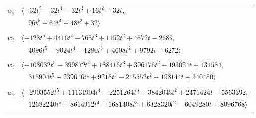 \documentclass[11pt]{article}
\begin{document}
\begin{longtable}{@{}ll@{}}
$w_i$ & $\langle -32t^{5}-32t^{4}-32t^{3}+16t^{2}-32t,$\\
 & $\quad 96t^{5}-64t^{4}+48t^{2}+32\rangle$\\
\addlinespace[2pt]
\multicolumn{2}{@{}p{0.97\textwidth}@{}}{$i=34$, $D_i=2$, $e_i=1$, $\rho_{ij}$: $2{:}1, \allowbreak 3{:}1, \allowbreak 7{:}2, \allowbreak 8{:}3, \allowbreak 16{:}3, \allowbreak 32{:}2, \allowbreak 35{:}1, \allowbreak 36{:}2, \allowbreak 37{:}1, \allowbreak 46{:}3, \allowbreak 60{:}3, \allowbreak 62{:}3, \allowbreak 65{:}1, \allowbreak 66{:}1, \allowbreak 70{:}1$}\\
$w_i$ & $\langle -128t^{5}+4416t^{4}-768t^{3}+1152t^{2}+4672t-2688,$\\
 & $\quad 4096t^{5}+9024t^{4}-1280t^{3}+4608t^{2}+9792t-6272\rangle$\\
\addlinespace[2pt]
\multicolumn{2}{@{}p{0.97\textwidth}@{}}{$i=35$, $D_i=2$, $e_i=0$, $\rho_{ij}$: $2{:}1, \allowbreak 4{:}1, \allowbreak 6{:}2, \allowbreak 16{:}1, \allowbreak 20{:}3, \allowbreak 23{:}1, \allowbreak 24{:}2, \allowbreak 25{:}3, \allowbreak 30{:}2, \allowbreak 32{:}2, \allowbreak 34{:}3, \allowbreak 37{:}2, \allowbreak 50{:}3, \allowbreak 57{:}2, \allowbreak 58{:}3, \allowbreak 69{:}2, \allowbreak 74{:}3$}\\
$w_i$ & $\langle -108032t^{5}-399872t^{4}+188416t^{3}+306176t^{2}-193024t+131584,$\\
 & $\quad 315904t^{5}+239616t^{4}+9216t^{3}-215552t^{2}-198144t+340480\rangle$\\
\addlinespace[2pt]
\multicolumn{2}{@{}p{0.97\textwidth}@{}}{$i=36$, $D_i=4$, $e_i=2$, $\rho_{ij}$: $2{:}1, \allowbreak 7{:}3, \allowbreak 9{:}1, \allowbreak 13{:}1, \allowbreak 20{:}1, \allowbreak 23{:}3, \allowbreak 24{:}1, \allowbreak 26{:}1, \allowbreak 27{:}1, \allowbreak 28{:}3, \allowbreak 34{:}2, \allowbreak 44{:}3, \allowbreak 51{:}1, \allowbreak 57{:}3, \allowbreak 58{:}3, \allowbreak 59{:}1, \allowbreak 62{:}2, \allowbreak 63{:}1, \allowbreak 73{:}2, \allowbreak 74{:}3$}\\
$w_i$ & $\langle -2903552t^{5}+11131904t^{4}-2251264t^{3}-3842048t^{2}+2471424t-5563392,$\\
 & $\quad 12682240t^{5}+8614912t^{4}+1681408t^{3}+6328320t^{2}-6049280t+8096768\rangle$\\
\addlinespace[2pt]
\multicolumn{2}{@{}p{0.97\textwidth}@{}}{$i=37$, $D_i=2$, $e_i=3$, $\rho_{ij}$: $4{:}3, \allowbreak 12{:}1, \allowbreak 19{:}3, \allowbreak 22{:}3, \allowbreak 23{:}3, \allowbreak 34{:}3, \allowbreak 35{:}2, \allowbreak 42{:}3, \allowbreak 55{:}3, \allowbreak 56{:}2, \allowbreak 59{:}1, \allowbreak 60{:}1, \allowbreak 65{:}1, \allowbreak 66{:}3, \allowbreak 70{:}1$}\\

\end{longtable}
\end{document}
